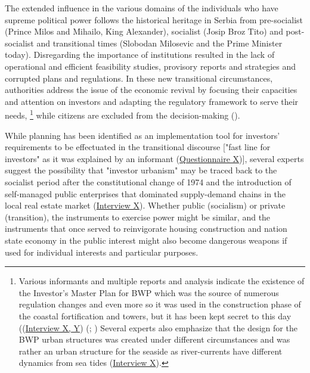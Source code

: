 \documentclass[11pt]{report}
\begin{document}
\begin{itemize}
The extended influence in the various domains of the individuals who have supreme political power follows the historical heritage in Serbia from pre-socialist (Prince Milos and Mihailo, King Alexander), socialist (Josip Broz Tito) and post-socialist and transitional times (Slobodan Milosevic and the Prime Minister today).  
Disregarding the importance of institutions resulted in the lack of operational and efficient feasibility studies, provisory reports and strategies and corrupted plans and regulations.
In these new transitional circumstances, authorities address the issue of the economic revival by focusing their capacities and attention on investors and adapting the regulatory framework to serve their needs,
\footnote{Various informants and multiple reports and analysis indicate the existence of the Investor’s Master Plan
for BWP which was the source of numerous regulation changes and even more so it was used in the construction phase of the coastal fortification and towers, but it has been kept secret to this day ((\href{InterviewX}{Interview X, Y})
(\href{Alternativni}{\citealt{pravni_skener_alternativni_2016}}; \href{NDVBGD}{\citealt{inicijativa_ne_davimo_beograd_analiza_2016}})
Several experts also emphasize that the design for the BWP urban structures was created under different circumstances and was rather an urban structure for the seaside as river-currents have different dynamics from sea tides (\href{InterviewX}{Interview X}).}
while citizens are excluded from the decision-making (\href{ref}{\citealt{ministarstvo_prostora_urbani_2014}}).

While planning has been identified as an implementation tool for investors' requirements to be effectuated in the transitional discourse ["fast line for investors" as it was explained by an informant (\href{Questionnaire Experts Post-socialist}{Questionnaire X})],
several experts suggest the possibility that "investor urbanism" may be traced back to the socialist period after the constitutional change of 1974 and the introduction of self-managed public enterprises that dominated supply-demand chains in the local real estate market (\href{InterviewX}{Interview X}).
Whether public (socialism) or private (transition), the instruments to exercise power might be similar, and the instruments that once served to reinvigorate housing construction and nation state economy in the public interest might also become dangerous weapons if used for individual interests and particular purposes.


\end{itemize}
\end{document}
